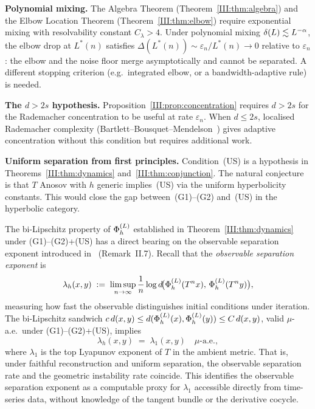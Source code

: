 \textbf{Polynomial mixing.}
The Algebra Theorem (Theorem~\ref{III:thm:algebra}) and the Elbow Location Theorem
(Theorem~\ref{III:thm:elbow}) require exponential mixing with resolvability constant
$C_\lambda > 4$.
Under polynomial mixing $\delta(L) \lesssim L^{-\alpha}$, the elbow drop at
$L^*(n)$ satisfies $\Delta(L^*(n)) \sim \varepsilon_n / L^*(n) \to 0$ relative
to $\varepsilon_n$: the elbow and the noise floor merge asymptotically and
cannot be separated.
A different stopping criterion (e.g.\ integrated elbow, or a bandwidth-adaptive
rule) is needed.

\textbf{The $d > 2s$ hypothesis.}
Proposition~\ref{III:prop:concentration} requires $d > 2s$ for the Rademacher
concentration to be useful at rate $\varepsilon_n$.
When $d \leq 2s$, localised Rademacher complexity
(Bartlett--Bousquet--Mendelson~\cite{BartlettBousquetMendelson2005})
gives adaptive concentration without this condition but requires additional
work.

\textbf{Uniform separation from first principles.}
Condition~(US) is a hypothesis in Theorems~\ref{III:thm:dynamics}
and~\ref{III:thm:conjunction}.
The natural conjecture is that $T$ Anosov with $h$ generic implies~(US) via
the uniform hyperbolicity constants.
This would close the gap between~(G1)--(G2) and~(US) in the hyperbolic category.

\begin{remark}
\label{III:rem:lyapunov}
The bi-Lipschitz property of $\Phi_h^{(L)}$ established in Theorem~\ref{III:thm:dynamics}
under (G1)--(G2)+(US) has a direct bearing on the observable separation exponent
introduced in~\cite{mahon_paper2} (Remark~II.7).
Recall that the \emph{observable separation exponent} is
\[
  \lambda_h(x,y)
  \;:=\; \limsup_{n\to\infty} \frac{1}{n}
  \log d\!\bigl(\Phi_h^{(L)}(T^n x),\, \Phi_h^{(L)}(T^n y)\bigr),
\]
measuring how fast the observable distinguishes initial conditions under iteration.
The bi-Lipschitz sandwich $c\,d(x,y) \leq d(\Phi_h^{(L)}(x),\Phi_h^{(L)}(y)) \leq C\,d(x,y)$,
valid $\mu$-a.e.\ under (G1)--(G2)+(US), implies
\[
  \lambda_h(x,y) \;=\; \lambda_1(x,y) \quad \mu\text{-a.e.},
\]
where $\lambda_1$ is the top Lyapunov exponent of $T$ in the ambient metric.
That is, under faithful reconstruction and uniform separation, the observable
separation rate and the geometric instability rate coincide.
This identifies the observable separation exponent as a computable proxy for
$\lambda_1$ accessible directly from time-series data, without knowledge of
the tangent bundle or the derivative cocycle.
\end{remark}

